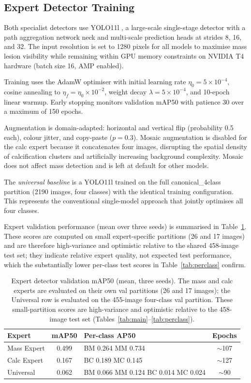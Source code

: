 \documentclass[runningheads]{llncs}
\begin{document}
\subsection{Expert Detector Training}

Both specialist detectors use YOLO11l \cite{jocher2024ultralytics}, a
large-scale single-stage detector with a path aggregation network neck
and multi-scale prediction heads at strides 8, 16, and 32. The input
resolution is set to 1280 pixels for all models to maximise mass
lesion visibility while remaining within GPU memory constraints on
NVIDIA T4 hardware (batch size 16, AMP enabled).

Training uses the AdamW optimiser with initial learning rate
$\eta_0 = 5 \times 10^{-4}$, cosine annealing to $\eta_f = \eta_0
\times 10^{-2}$, weight decay $\lambda = 5 \times 10^{-4}$, and
10-epoch linear warmup. Early stopping monitors validation mAP50 with
patience 30 over a maximum of 150 epochs.

Augmentation is domain-adapted: horizontal and vertical flip
(probability 0.5 each), colour jitter, and copy-paste ($p = 0.3$).
Mosaic augmentation is disabled for the calc expert because it
concatenates four images, disrupting the spatial density of
calcification clusters and artificially increasing background
complexity. Mosaic does not affect mass detection and is left at
default for other models.

The \textit{universal baseline} is a YOLO11l trained on the full
canonical\_4class partition (2190 images, four classes) with the
identical training configuration. This represents the conventional
single-model approach that jointly optimises all four classes.

Expert validation performance (mean over three seeds) is summarised in
Table~\ref{tab:expert_val}. These scores are computed on small
expert-specific partitions (26 and 17 images) and are therefore
high-variance and optimistic relative to the shared 458-image test set;
they indicate relative expert quality, not expected test performance,
which the substantially lower per-class test scores in
Table~\ref{tab:perclass} confirm.

\begin{table}[tb]
\caption{Expert detector validation mAP50 (mean, three seeds). The mass
and calc experts are evaluated on their own val partitions (26 and 17
images); the Universal row is evaluated on the 455-image four-class val
partition. These small-partition scores are high-variance and optimistic
relative to the 458-image test set (Tables~\ref{tab:main}--\ref{tab:perclass}).}
\label{tab:expert_val}
\centering
\begin{tabular}{lclc}
\toprule
\textbf{Expert} & \textbf{mAP50} & \textbf{Per-class AP50} & \textbf{Epochs}\\
\midrule
Mass Expert  & 0.499 & BM 0.264 \quad MM 0.734 & $\sim$107\\
Calc Expert  & 0.167 & BC 0.189 \quad MC 0.145 & $\sim$127\\
Universal    & 0.062 & BM 0.066 \quad MM 0.124 \quad BC 0.014 \quad MC 0.024 & $\sim$90\\
\bottomrule
\end{tabular}
\end{table}
\end{document}
